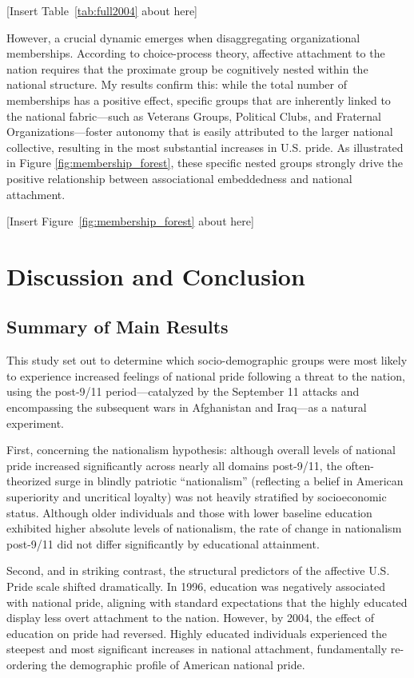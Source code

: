 \documentclass[12pt,letterpaper]{article}
\begin{document}
[Insert Table~\ref{tab:full2004} about here]

However, a crucial dynamic emerges when disaggregating organizational memberships. According to choice-process theory, affective attachment to the nation requires that the proximate group be cognitively nested within the national structure. My results confirm this: while the total number of memberships has a positive effect, specific groups that are inherently linked to the national fabric---such as Veterans Groups, Political Clubs, and Fraternal Organizations---foster autonomy that is easily attributed to the larger national collective, resulting in the most substantial increases in U.S. pride. As illustrated in Figure \ref{fig:membership_forest}, these specific nested groups strongly drive the positive relationship between associational embeddedness and national attachment. 

[Insert Figure~\ref{fig:membership_forest} about here]

\section{Discussion and Conclusion}

\subsection{Summary of Main Results}
This study set out to determine which socio-demographic groups were most likely to experience increased feelings of national pride following a threat to the nation, using the post-9/11 period---catalyzed by the September 11 attacks and encompassing the subsequent wars in Afghanistan and Iraq---as a natural experiment.

First, concerning the nationalism hypothesis: although overall levels of national pride increased significantly across nearly all domains post-9/11, the often-theorized surge in blindly patriotic ``nationalism'' (reflecting a belief in American superiority and uncritical loyalty) was not heavily stratified by socioeconomic status. Although older individuals and those with lower baseline education exhibited higher absolute levels of nationalism, the rate of change in nationalism post-9/11 did not differ significantly by educational attainment.

Second, and in striking contrast, the structural predictors of the affective U.S. Pride scale shifted dramatically. In 1996, education was negatively associated with national pride, aligning with standard expectations that the highly educated display less overt attachment to the nation. However, by 2004, the effect of education on pride had reversed. Highly educated individuals experienced the steepest and most significant increases in national attachment, fundamentally re-ordering the demographic profile of American national pride. 
\end{document}
